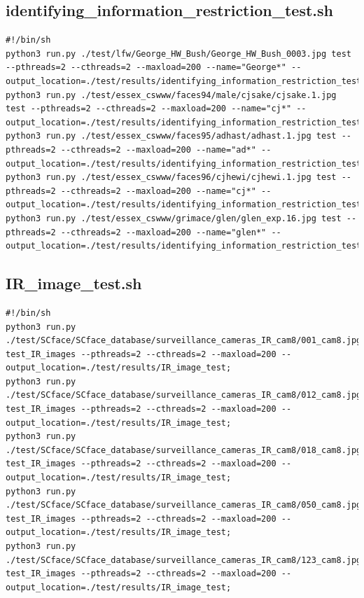 \documentclass[12pt]{article}
\begin{document}
\begin{appendices}
\subsection{identifying\_information\_restriction\_test.sh}
\begin{lstlisting}
#!/bin/sh
python3 run.py ./test/lfw/George_HW_Bush/George_HW_Bush_0003.jpg test --pthreads=2 --cthreads=2 --maxload=200 --name="George*" --output_location=./test/results/identifying_information_restriction_test;
python3 run.py ./test/essex_cswww/faces94/male/cjsake/cjsake.1.jpg test --pthreads=2 --cthreads=2 --maxload=200 --name="cj*" --output_location=./test/results/identifying_information_restriction_test;
python3 run.py ./test/essex_cswww/faces95/adhast/adhast.1.jpg test --pthreads=2 --cthreads=2 --maxload=200 --name="ad*" --output_location=./test/results/identifying_information_restriction_test;
python3 run.py ./test/essex_cswww/faces96/cjhewi/cjhewi.1.jpg test --pthreads=2 --cthreads=2 --maxload=200 --name="cj*" --output_location=./test/results/identifying_information_restriction_test;
python3 run.py ./test/essex_cswww/grimace/glen/glen_exp.16.jpg test --pthreads=2 --cthreads=2 --maxload=200 --name="glen*" --output_location=./test/results/identifying_information_restriction_test;
\end{lstlisting}

\subsection{IR\_image\_test.sh}
\begin{lstlisting}
#!/bin/sh
python3 run.py ./test/SCface/SCface_database/surveillance_cameras_IR_cam8/001_cam8.jpg test_IR_images --pthreads=2 --cthreads=2 --maxload=200 --output_location=./test/results/IR_image_test;
python3 run.py ./test/SCface/SCface_database/surveillance_cameras_IR_cam8/012_cam8.jpg test_IR_images --pthreads=2 --cthreads=2 --maxload=200 --output_location=./test/results/IR_image_test;
python3 run.py ./test/SCface/SCface_database/surveillance_cameras_IR_cam8/018_cam8.jpg test_IR_images --pthreads=2 --cthreads=2 --maxload=200 --output_location=./test/results/IR_image_test;
python3 run.py ./test/SCface/SCface_database/surveillance_cameras_IR_cam8/050_cam8.jpg test_IR_images --pthreads=2 --cthreads=2 --maxload=200 --output_location=./test/results/IR_image_test;
python3 run.py ./test/SCface/SCface_database/surveillance_cameras_IR_cam8/123_cam8.jpg test_IR_images --pthreads=2 --cthreads=2 --maxload=200 --output_location=./test/results/IR_image_test;
\end{lstlisting}


\end{appendices}
\end{document}
